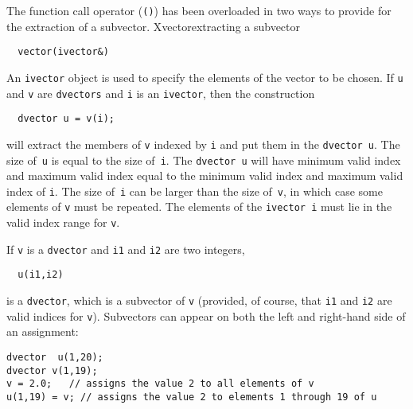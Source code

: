 \documentclass{admbmanual}
\begin{document}
The function call operator (\texttt{()}) has been overloaded in two ways to
provide for the extraction of a subvector. X{vector}{extracting a subvector}
\begin{lstlisting}
  vector(ivector&)
\end{lstlisting}
An \texttt{ivector} object is used to specify the elements of the vector to be
chosen. If \texttt{u} and \texttt{v} are \texttt{dvectors} and \texttt{i} is an
\texttt{ivector}, then the construction
\begin{lstlisting}
  dvector u = v(i);
\end{lstlisting}
will extract the members of \texttt{v} indexed by \texttt{i} and put them in the
\texttt{dvector u}. The size of~\texttt{u} is equal to the size of~\texttt{i}.
The \texttt{dvector u} will have minimum valid index and maximum valid index
equal to the minimum valid index and maximum valid index of \texttt{i}. The size
of~\texttt{i} can be larger than the size of~\texttt{v}, in which case some
elements of \texttt{v} must be repeated. The elements of the \texttt{ivector i}
must lie in the valid index range for \texttt{v}.

If \texttt{v} is a \texttt{dvector} and \texttt{i1} and \texttt{i2} are two
integers,
\begin{lstlisting}
  u(i1,i2)
\end{lstlisting}
is a \texttt{dvector}, which is a subvector of \texttt{v} (provided, of course,
that \texttt{i1} and \texttt{i2} are valid indices for \texttt{v}). Subvectors
can appear on both the left and right-hand side of an assignment:
\begin{lstlisting}
dvector  u(1,20);
dvector v(1,19);
v = 2.0;   // assigns the value 2 to all elements of v
u(1,19) = v; // assigns the value 2 to elements 1 through 19 of u
\end{lstlisting}
\end{document}
